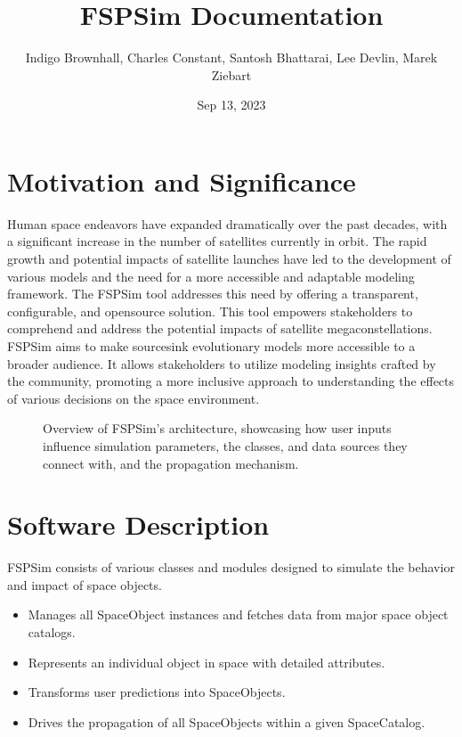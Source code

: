 \documentclass[letterpaper,10pt,english]{sphinxmanual}
\title{FSPSim Documentation}
\date{Sep 13, 2023}
\author{Indigo Brownhall, 
Charles Constant, 
Santosh Bhattarai, 
Lee Devlin, 
Marek Ziebart}
\begin{document}
\pagestyle{empty}
\sphinxmaketitle
\pagestyle{plain}
\sphinxtableofcontents
\pagestyle{normal}
\label{\detokenize{index::doc}}



\chapter{Motivation and Significance}
\label{\detokenize{index:motivation-and-significance}}
\sphinxAtStartPar
Human space endeavors have expanded dramatically over the past decades, with a significant increase in the number of satellites currently in orbit.
The rapid growth and potential impacts of satellite launches have led to the development of various models and the need for a more accessible and adaptable modeling framework.
The FSPSim tool addresses this need by offering a transparent, configurable, and open\sphinxhyphen{}source solution. This tool empowers stakeholders to comprehend and address the potential impacts of satellite mega\sphinxhyphen{}constellations.
FSPSim aims to make source\sphinxhyphen{}sink evolutionary models more accessible to a broader audience. It allows stakeholders to utilize modeling insights crafted by the community, promoting a more inclusive approach to understanding the effects of various decisions on the space environment.

\begin{figure}[htbp]
\centering
\capstart

\noindent{}
\caption{Overview of FSPSim’s architecture, showcasing how user inputs influence simulation parameters, the classes, and data sources they connect with, and the propagation mechanism.}\label{\detokenize{index:id1}}\end{figure}


\chapter{Software Description}
\label{\detokenize{index:software-description}}
\sphinxAtStartPar
FSPSim consists of various classes and modules designed to simulate the behavior and impact of space objects.
\begin{itemize}
\item {} 
\sphinxAtStartPar
{} Manages all SpaceObject instances and fetches data from major space object catalogs.

\item {} 
\sphinxAtStartPar
{} Represents an individual object in space with detailed attributes.

\item {} 
\sphinxAtStartPar
{} Transforms user predictions into SpaceObjects.

\item {} 
\sphinxAtStartPar
{} Drives the propagation of all SpaceObjects within a given SpaceCatalog.

\end{itemize}
\end{document}
